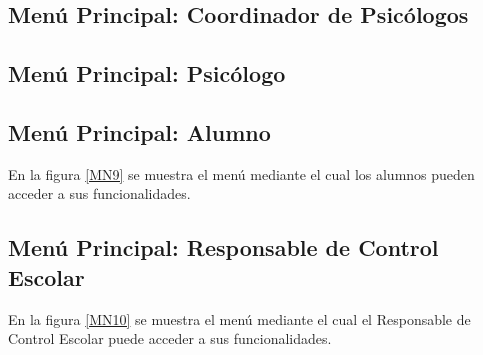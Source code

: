 \hypertarget{menu:CoordinadorPsicologo}{}	
\subsection{Menú Principal: Coordinador de Psicólogos}



\hypertarget{menu:Psicologo}{}		
\subsection{Menú Principal: Psicólogo}


\hypertarget{menu:Alumno}{}	
\subsection{Menú Principal: Alumno}
En la figura \ref{MN9} se muestra el menú mediante el cual los alumnos pueden acceder a sus funcionalidades.

\hypertarget{menu:ResponsableControlEscolar}{}	
\subsection{Menú Principal: Responsable de Control Escolar}
En la figura \ref{MN10} se muestra el menú mediante el cual el Responsable de Control Escolar puede acceder a sus funcionalidades.
